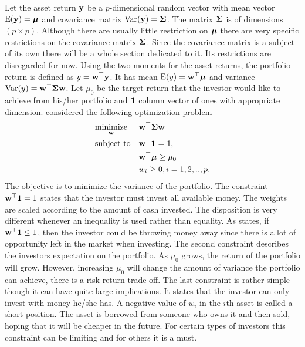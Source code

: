 \documentclass[12pt, oneside]{book}\usepackage{knitr}
\begin{document}
{Let the asset return $\mathbf{y}$ be a $p$-dimensional random vector with mean vector $\operatorname{E}(\mathbf{y})=\mbox{\boldmath$\mu$}$ and covariance matrix $\operatorname{Var}(\mathbf{y})=\mathbf{\Sigma}$. 
The matrix $\mathbf{\Sigma}$ is of dimensions $(p \times p)$. 
Although there are usually little restriction on $\mbox{\boldmath$\mu$}$ there are very specific restrictions on the covariance matrix $\mathbf{\Sigma}$. 
Since the covariance matrix is a subject of its own there will be a whole section dedicated to it.
Its restrictions are disregarded for now.
Using the two moments for the asset returns, the portfolio return is defined as $y = \mathbf{w}^\top \mathbf{y}$.
It has mean $\operatorname{E}(y)=\mathbf{w}^\top \mbox{\boldmath$\mu$}$ and variance $\operatorname{Var}(y)=\mathbf{w}^\top \mathbf{\Sigma} \mathbf{w}$. 
Let $\mu_0$ be the target return that the investor would like to achieve from his/her portfolio and $\mathbf{1}$ column vector of ones with appropriate dimension. 
\citet{markowitz1959portfolio} considered the following optimization problem
\begin{equation}\label{eqn:markowitz_optim}
\begin{aligned}
& \underset{\mathbf{w}}{\text{minimize}} 
& & \mathbf{w}^\top \mathbf{\Sigma} \mathbf{w} \\
& \text{subject to}
& & \mathbf{w}^\top \mathbf{1} = 1, \\
& && \mathbf{w}^\top \mbox{\boldmath$\mu$} \geq \mu_0 \\
&&& w_i \geq 0, i=1,2,..,p.
\end{aligned}
\end{equation}
The objective is to minimize the variance of the portfolio. 
The constraint $\mathbf{w}^\top \mathbf{1} = 1$ states that the investor must invest all available money. 
The weights are scaled according to the amount of cash invested.
The disposition is very different whenever an inequality is used rather than equality. 
As \citet{hult2012risk} states, if $\mathbf{w}^\top \mathbf{1} \leq 1$, then the investor could be throwing money away since there is a lot of opportunity left in the market when investing.
The second constraint describes the investors expectation on the portfolio. 
As $\mu_0$ grows, the return of the portfolio will grow. 
However, increasing $\mu_0$ will change the amount of variance the portfolio can achieve, there is a risk-return trade-off. 
The last constraint is rather simple though it can have quite large implications. 
It states that the investor can only invest with money he/she has. 
A negative value of $w_i$ in the $i$th asset is called a short position.
The asset is borrowed from someone who owns it and then sold, hoping that it will be cheaper in the future.
For certain types of investors this constraint can be limiting and for others it is a must.
}
\end{document}
